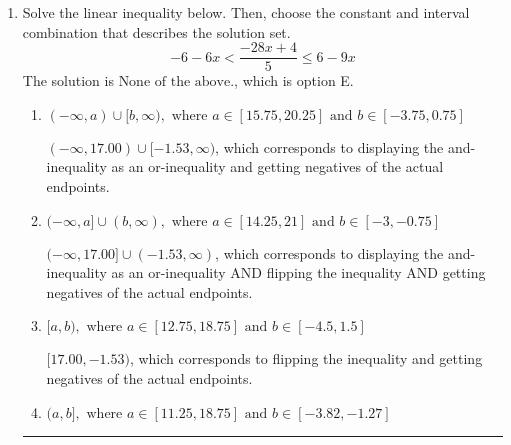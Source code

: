 \documentclass{extbook}[14pt]
\newcommand{\litem}[1]{\item #1

\rule{\textwidth}{0.4pt}}
\begin{document}
\begin{enumerate}
{\begin{enumerate}[label=\Alph*.]
Corresponds to including the endpoints (when they should be excluded).
\item \( (-\infty, a) \cup (b, \infty), \text{ where } a \in [-10.5, -7.5] \text{ and } b \in [1.5, 6.75] \)

 * Correct option.
\item \( (-\infty, a] \cup [b, \infty), \text{ where } a \in [-6, 0.75] \text{ and } b \in [5.25, 12] \)

Corresponds to including the endpoints AND negating.
\item \( (-\infty, a) \cup (b, \infty), \text{ where } a \in [-3.75, -0.75] \text{ and } b \in [3.75, 8.25] \)

Corresponds to inverting the inequality and negating the solution.
\item \( (-\infty, \infty) \)

Corresponds to the variable canceling, which does not happen in this instance.
\end{enumerate}

\textbf{General Comment:} When multiplying or dividing by a negative, flip the sign.
}
\litem{
Solve the linear inequality below. Then, choose the constant and interval combination that describes the solution set.
\[ -6 - 6 x < \frac{-28 x + 4}{5} \leq 6 - 9 x \]The solution is \( \text{None of the above.} \), which is option E.\begin{enumerate}[label=\Alph*.]
\item \( (-\infty, a) \cup [b, \infty), \text{ where } a \in [15.75, 20.25] \text{ and } b \in [-3.75, 0.75] \)

$(-\infty, 17.00) \cup [-1.53, \infty)$, which corresponds to displaying the and-inequality as an or-inequality and getting negatives of the actual endpoints.
\item \( (-\infty, a] \cup (b, \infty), \text{ where } a \in [14.25, 21] \text{ and } b \in [-3, -0.75] \)

$(-\infty, 17.00] \cup (-1.53, \infty)$, which corresponds to displaying the and-inequality as an or-inequality AND flipping the inequality AND getting negatives of the actual endpoints.
\item \( [a, b), \text{ where } a \in [12.75, 18.75] \text{ and } b \in [-4.5, 1.5] \)

$[17.00, -1.53)$, which corresponds to flipping the inequality and getting negatives of the actual endpoints.
\item \( (a, b], \text{ where } a \in [11.25, 18.75] \text{ and } b \in [-3.82, -1.27] \)


\end{enumerate}}
\end{enumerate}
\end{document}
